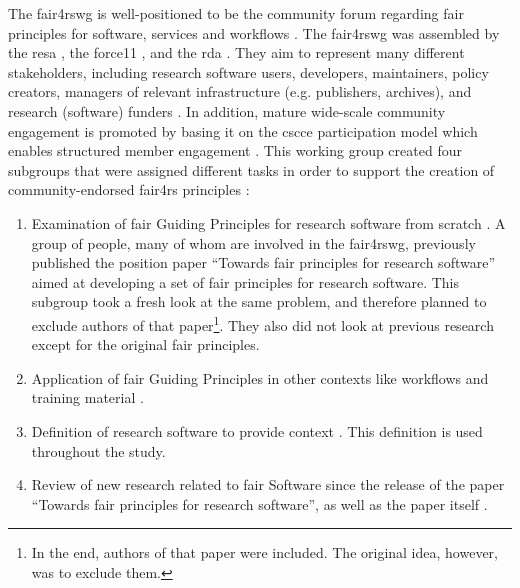 The \acrfull{fair4rswg} is well-positioned to be the community forum regarding \acrshort{fair} principles for software, services and workflows \cite{noauthor_six_nodate}. The \acrshort{fair4rswg} was assembled by the \acrfull{resa} \cite{alliance_task_2020}, the \acrfull{force11} \cite{force11_members}, and the \acrfull{rda} \cite{RDABerman2020Research}. They aim to represent many different stakeholders, including research software users, developers, maintainers, policy creators, managers of relevant infrastructure (e.g. publishers, archives), and research (software) funders \cite{katz_fair4rs_2021}. In addition, mature wide-scale community engagement is promoted by basing it on the \acrfull{cscce} participation model which enables structured member engagement \cite{woodley_cscce_2020}. This working group created four subgroups that were assigned different tasks in order to support the creation of community-endorsed \acrshort{fair4rs} principles \cite{chue_hong_fair_2021, chue_hong_fair_2022}:
\begin{enumerate}
    \item Examination of \acrshort{fair} Guiding Principles for research software from scratch \cite{katz_fresh_2021}. A group of people, many of whom are involved in the \acrshort{fair4rswg}, previously published the position paper “Towards \acrshort{fair} principles for research software” \cite{lamprecht_towards_2020} aimed at developing a set of \acrshort{fair} principles for research software. This subgroup took a fresh look at the same problem, and therefore planned to exclude authors of that paper\footnote{In the end, authors of that paper were included. The original idea, however, was to exclude them.}. They also did not look at previous research except for the original \acrshort{fair} principles. 
    \item Application of \acrshort{fair} Guiding Principles in other contexts like workflows and training material \cite{kuzak_fair4rs_nodate}.
    \item Definition of research software to provide context \cite{gruenpeter_defining_2021}. This definition is used throughout the study.
    \item Review of new research related to \acrshort{fair} Software since the release of the paper “Towards \acrshort{fair} principles for research software”, as well as the paper itself \cite{lamprecht_towards_2020, wg_fair4rs_2021, chue_hong_what_2021}. 
\end{enumerate}
